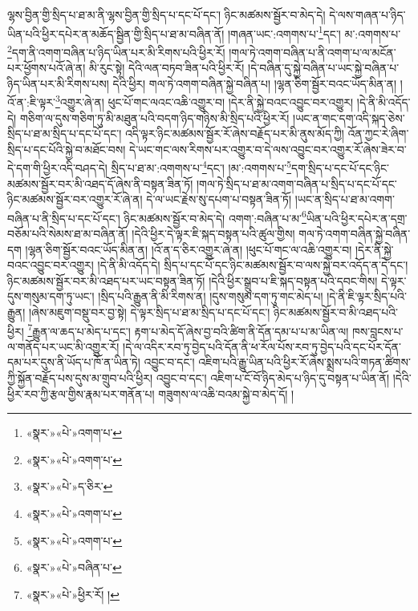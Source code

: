ལྷས་བྱིན་གྱི་སྲིད་པ་ཐ་མ་ནི་ལྷས་བྱིན་གྱི་སྲིད་པ་དང་པོ་དང་། ཉིང་མཚམས་སྦྱོར་བ་མེད་དེ། དེ་ལས་གཞན་པ་ཉིད་ཡིན་པའི་ཕྱིར་དཔེར་ན་མཆོད་སྦྱིན་གྱི་སྲིད་པ་ཐ་མ་བཞིན་ནོ། །གཞན་ཡང་:འགགས་པ་\footnote{«སྣར་»«པེ་»འགག་པ་}དང་། མ་:འགགས་པ་\footnote{«སྣར་»«པེ་»འགག་པ་}དག་ནི་འགག་བཞིན་པ་ཉིད་ཡིན་པར་མི་རིགས་པའི་ཕྱིར་རོ། །གལ་ཏེ་འགག་བཞིན་པ་ནི་འགག་པ་ལ་མངོན་པར་ཕྱོགས་པའོ་ཞེ་ན། མི་རུང་སྟེ། དེའི་ལན་བཏབ་ཟིན་པའི་ཕྱིར་རོ། །དེ་བཞིན་དུ་སྐྱེ་བཞིན་པ་ཡང་སྐྱེ་བཞིན་པ་ཉིད་ཡིན་པར་མི་རིགས་པས། དེའི་ཕྱིར། གལ་ཏེ་འགག་བཞིན་སྐྱེ་བཞིན་པ། །ལྷན་ཅིག་སྦྱོར་བའང་ཡོད་མིན་ན། །འོ་ན་:ཇི་ལྟར་\footnote{«སྣར་»«པེ་»ད་ཅིར་}འགྱུར་ཞེ་ན། ཕུང་པོ་གང་ལའང་འཆི་འགྱུར་བ། །དེར་ནི་སྐྱེ་བའང་འབྱུང་བར་འགྱུར། །དེ་ནི་མི་འདོད་དེ། གཅིག་ལ་དུས་གཅིག་ཏུ་མི་མཐུན་པའི་བདག་ཉིད་གཉིས་མི་སྲིད་པའི་ཕྱིར་རོ། །ཡང་ན་གང་དག་འདི་སྐད་ཅེས་སྲིད་པ་ཐ་མ་སྲིད་པ་དང་པོ་དང་། འདི་ལྟར་ཉིང་མཚམས་སྦྱོར་རོ་ཞེས་བརྗོད་པར་མི་ནུས་མོད་ཀྱི། འོན་ཀྱང་རེ་ཞིག་སྲིད་པ་དང་པོའི་སྐྱེ་བ་མཐོང་བས། དེ་ཡང་གང་ལས་རིགས་པར་འགྱུར་བ་དེ་ལས་འབྱུང་བར་འགྱུར་རོ་ཞེས་ཟེར་བ་དེ་དག་གི་ཕྱིར་འདི་བཤད་དེ། སྲིད་པ་ཐ་མ་:འགགས་པ་\footnote{«སྣར་»«པེ་»འགག་པ་}དང་། །མ་:འགགས་པ་\footnote{«སྣར་»«པེ་»འགག་པ་}དག་སྲིད་པ་དང་པོ་དང་ཉིང་མཚམས་སྦྱོར་བར་མི་འཐད་དོ་ཞེས་ནི་བསྟན་ཟིན་ཏོ། །གལ་ཏེ་སྲིད་པ་ཐ་མ་འགག་བཞིན་པ་སྲིད་པ་དང་པོ་དང་ཉིང་མཚམས་སྦྱོར་བར་འགྱུར་རོ་ཞེ་ན། དེ་ལ་ཡང་རྗེས་སུ་དཔག་པ་བསྟན་ཟིན་ཏོ། །ཡང་ན་སྲིད་པ་ཐ་མ་འགག་བཞིན་པ་ནི་སྲིད་པ་དང་པོ་དང་། ཉིང་མཚམས་སྦྱོར་བ་མེད་དེ། འགག་:བཞིན་པ་མ་\footnote{«སྣར་»«པེ་»བཞིན་པ་}ཡིན་པའི་ཕྱིར་དཔེར་ན་དགྲ་བཅོམ་པའི་སེམས་ཐ་མ་བཞིན་ནོ། །དེའི་ཕྱིར་དེ་ལྟར་ཇི་སྐད་བསྟན་པའི་ཚུལ་གྱིས། གལ་ཏེ་འགག་བཞིན་སྐྱེ་བཞིན་དག །ལྷན་ཅིག་སྦྱོར་བའང་ཡོད་མིན་ན། །འོ་ན་ད་ཅིར་འགྱུར་ཞེ་ན། །ཕུང་པོ་གང་ལ་འཆི་འགྱུར་བ། །དེར་ནི་སྐྱེ་བའང་འབྱུང་བར་འགྱུར། །དེ་ནི་མི་འདོད་དེ། སྲིད་པ་དང་པོ་དང་ཉིང་མཚམས་སྦྱོར་བ་ལས་སྐྱེ་བར་འདོད་ན་དེ་དང་། ཉིང་མཚམས་སྦྱོར་བར་མི་འཐད་པར་ཡང་བསྟན་ཟིན་ཏོ། །དེའི་ཕྱིར་སྒྲུབ་པ་ཇི་སྐད་བསྟན་པའི་དབང་གིས། དེ་ལྟར་དུས་གསུམ་དག་ཏུ་ཡང་། །སྲིད་པའི་རྒྱུན་ནི་མི་རིགས་ན། །དུས་གསུམ་དག་ཏུ་གང་མེད་པ། །དེ་ནི་ཇི་ལྟར་སྲིད་པའི་རྒྱུན། །ཞེས་མཇུག་བསྡུ་བར་བྱ་སྟེ། དེ་ལྟར་སྲིད་པ་ཐ་མ་སྲིད་པ་དང་པོ་དང་། ཉིང་མཚམས་སྦྱོར་བ་མི་འཐད་པའི་ཕྱིར། \footnote{«སྣར་»«པེ་»ཕྱིར་རོ། ། }རྒྱུན་ལ་ཆད་པ་མེད་པ་དང་། རྟག་པ་མེད་དོ་ཞེས་བྱ་བའི་ཚིག་ནི་དོན་དམ་པ་པ་མ་ཡིན་ལ། ཁས་བླངས་པ་ལ་གནོད་པར་ཡང་མི་འགྱུར་རོ། །དེ་ལ་འདིར་རབ་ཏུ་བྱེད་པའི་དོན་ནི་ཕ་རོལ་པོས་རབ་ཏུ་བྱེད་པའི་དང་པོར་དོན་དམ་པར་དུས་ནི་ཡོད་པ་ཁོ་ན་ཡིན་ཏེ། འབྱུང་བ་དང་། འཇིག་པའི་རྒྱུ་ཡིན་པའི་ཕྱིར་རོ་ཞེས་སྨྲས་པའི་གཏན་ཚིགས་ཀྱི་སྐྱོན་བརྗོད་པས་དུས་མ་གྲུབ་པའི་ཕྱིར། འབྱུང་བ་དང་། འཇིག་པ་ངོ་བོ་ཉིད་མེད་པ་ཉིད་དུ་བསྟན་པ་ཡིན་ནོ། །དེའི་ཕྱིར་རབ་ཀྱི་རྩལ་གྱིས་རྣམ་པར་གནོན་པ། གཟུགས་ལ་འཆི་བའམ་སྐྱེ་བ་མེད་དོ། །
